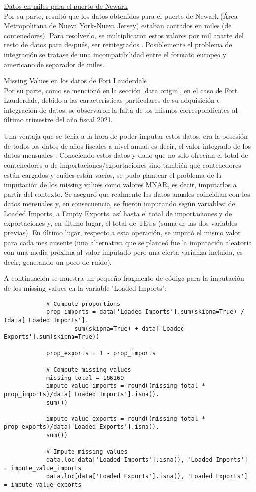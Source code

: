 \documentclass[12pt]{article}
\begin{document}
		\underline{Datos en miles para el puerto de Newark}\\
		Por su parte, resultó que los datos obtenidos para el puerto de Newark (Área Metropolitana de Nueva York-Nueva Jersey) estaban contados en miles (de contenedores). Para resolverlo, se multiplicaron estos valores por mil aparte del resto de datos para después, ser reintegrados \cite{panynj2025facts}. Posiblemente el problema de integración se tratase de una incompatibilidad entre el formato europeo y americano de separador de miles.
		
		\underline{Missing Values en los datos de Fort Lauderdale}\\
		Por su parte, como se mencionó en la sección \ref{data origin}, en el caso de Fort Lauderdale, debido a las características particulares de su adquisición e integración de datos, se observaron la falta de los mismos correspondientes al último trimestre del año fiscal 2021.
		
		
		Una ventaja que se tenía a la hora de poder imputar estos datos, era la posesión de todos los datos de años fiscales a nivel anual, es decir, el valor integrado de los datos mensuales \cite{waterborne2024commerce}. Conociendo estos datos y dado que no solo ofrecían el total de contenedores o de importaciones/exportaciones sino también qué contenedores están cargados y cuáles están vacíos, se pudo plantear el problema de la imputación de los missing values como valores MNAR, es decir, imputarlos a partir del contexto. Se aseguró que realmente los datos anuales coincidían con los datos mensuales y, en consecuencia, se fueron imputando según variables: de Loaded Imports, a Empty Exports, así hasta el total de importaciones y de exportaciones y, en último lugar, el total de TEUs (suma de las dos variables previas). En último lugar, respecto a esta operación, se imputó el mismo valor para cada mes ausente (una alternativa que se planteó fue la imputación aleatoria con una media próxima al valor imputado pero una cierta varianza incluida, es decir, generando un poco de ruido).
		
		A continuación se muestra un pequeño fragmento de código para la imputación de los missing values en la variable "Loaded Imports":
		
		\begin{verbatim}
			# Compute proportions
			prop_imports = data['Loaded Imports'].sum(skipna=True) / (data['Loaded Imports'].
					sum(skipna=True) + data['Loaded Exports'].sum(skipna=True))
					
			prop_exports = 1 - prop_imports
			
			# Compute missing values
			missing_total = 186169
			impute_value_imports = round((missing_total * prop_imports)/data['Loaded Imports'].isna().
			sum())
			
			impute_value_exports = round((missing_total * prop_exports)/data['Loaded Exports'].isna().
			sum())
			
			# Impute missing values
			data.loc[data['Loaded Imports'].isna(), 'Loaded Imports'] = impute_value_imports
			data.loc[data['Loaded Exports'].isna(), 'Loaded Exports'] = impute_value_exports
		\end{verbatim}
	
\end{document}
